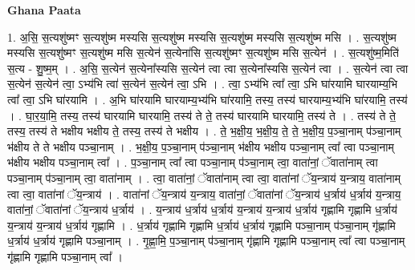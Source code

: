 \documentclass[17pt]{extarticle}
\begin{document}
\textbf{Ghana Paata } \newline

1. अ॒सि॒ स॒त्यशु॑ष्मꣳ स॒त्यशु॑ष्म मस्यसि स॒त्यशु॑ष्म मस्यसि स॒त्यशु॑ष्म मस्यसि स॒त्यशु॑ष्म मसि । . स॒त्यशु॑ष्म मस्यसि स॒त्यशु॑ष्मꣳ स॒त्यशु॑ष्म मसि स॒त्येन॑ स॒त्येना॑सि स॒त्यशु॑ष्मꣳ स॒त्यशु॑ष्म मसि स॒त्येन॑ । . स॒त्यशु॑ष्म॒मिति॑ स॒त्य - शु॒ष्म॒म् । . अ॒सि॒ स॒त्येन॑ स॒त्येना᳚स्यसि स॒त्येन॑ त्वा त्वा स॒त्येना᳚स्यसि स॒त्येन॑ त्वा । . स॒त्येन॑ त्वा त्वा स॒त्येन॑ स॒त्येन॑ त्वा॒ ऽभ्य॑भि त्वा॑ स॒त्येन॑ स॒त्येन॑ त्वा॒ ऽभि । . त्वा॒ ऽभ्य॑भि त्वा᳚ त्वा॒ ऽभि घा॑रयामि घारयाम्य॒भि त्वा᳚ त्वा॒ ऽभि घा॑रयामि । . अ॒भि घा॑रयामि घारयाम्य॒भ्य॑भि घा॑रयामि॒ तस्य॒ तस्य॑ घारयाम्य॒भ्य॑भि घा॑रयामि॒ तस्य॑ । . घा॒र॒या॒मि॒ तस्य॒ तस्य॑ घारयामि घारयामि॒ तस्य॑ ते ते॒ तस्य॑ घारयामि घारयामि॒ तस्य॑ ते । . तस्य॑ ते ते॒ तस्य॒ तस्य॑ ते भक्षीय भक्षीय ते॒ तस्य॒ तस्य॑ ते भक्षीय । . ते॒ भ॒क्षी॒य॒ भ॒क्षी॒य॒ ते॒ ते॒ भ॒क्षी॒य॒ प॒ञ्चा॒नाम् प॑ञ्चा॒नाम् भ॑क्षीय ते ते भक्षीय पञ्चा॒नाम् । . भ॒क्षी॒य॒ प॒ञ्चा॒नाम् प॑ञ्चा॒नाम् भ॑क्षीय भक्षीय पञ्चा॒नाम् त्वा᳚ त्वा पञ्चा॒नाम् भ॑क्षीय भक्षीय पञ्चा॒नाम् त्वा᳚ । . प॒ञ्चा॒नाम् त्वा᳚ त्वा पञ्चा॒नाम् प॑ञ्चा॒नाम् त्वा॒ वाता॑नां॒ ॅवाता॑नाम् त्वा पञ्चा॒नाम् प॑ञ्चा॒नाम् त्वा॒ वाता॑नाम् । . त्वा॒ वाता॑नां॒ ॅवाता॑नाम् त्वा त्वा॒ वाता॑नां ॅय॒न्त्राय॑ य॒न्त्राय॒ वाता॑नाम् त्वा त्वा॒ वाता॑नां ॅय॒न्त्राय॑ । . वाता॑नां ॅय॒न्त्राय॑ य॒न्त्राय॒ वाता॑नां॒ ॅवाता॑नां ॅय॒न्त्राय॑ ध॒र्त्राय॑ ध॒र्त्राय॑ य॒न्त्राय॒ वाता॑नां॒ ॅवाता॑नां ॅय॒न्त्राय॑ ध॒र्त्राय॑ । . य॒न्त्राय॑ ध॒र्त्राय॑ ध॒र्त्राय॑ य॒न्त्राय॑ य॒न्त्राय॑ ध॒र्त्राय॑ गृह्णामि गृह्णामि ध॒र्त्राय॑ य॒न्त्राय॑ य॒न्त्राय॑ ध॒र्त्राय॑ गृह्णामि । . ध॒र्त्राय॑ गृह्णामि गृह्णामि ध॒र्त्राय॑ ध॒र्त्राय॑ गृह्णामि पञ्चा॒नाम् प॑ञ्चा॒नाम् गृ॑ह्णामि ध॒र्त्राय॑ ध॒र्त्राय॑ गृह्णामि पञ्चा॒नाम् । . गृ॒ह्णा॒मि॒ प॒ञ्चा॒नाम् प॑ञ्चा॒नाम् गृ॑ह्णामि गृह्णामि पञ्चा॒नाम् त्वा᳚ त्वा पञ्चा॒नाम् गृ॑ह्णामि गृह्णामि पञ्चा॒नाम् त्वा᳚ । \newline
\end{document}
